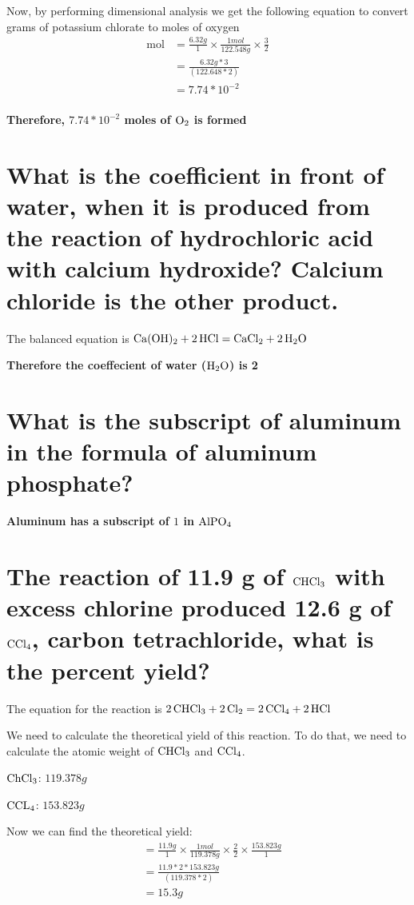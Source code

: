 \documentclass{scrartcl}
\begin{document}
Now, by performing dimensional analysis we get the following equation to convert
grams of potassium chlorate to moles of oxygen
\begin{align*}
  \text{mol}&=\frac{6.32g}{1}\times\frac{1mol}{122.548g}\times\frac{3}{2}\\
  &=\frac{6.32g*3}{(122.648*2)}\\
  &=7.74*10^{-2}\\
\end{align*}

\textbf{Therefore, \(7.74*10^{-2}\) moles of \(\ce{O2}\) is formed}

\section{What is the coefficient in front of water, when it is produced from the reaction of hydrochloric acid with calcium hydroxide? Calcium chloride is the other product.}
\label{sec:orgccc9176}
The balanced equation is
\(\ce{Ca(OH)2 + 2HCl}=\ce{CaCl2 + 2H2O}\)

\textbf{Therefore the coeffecient of water (\(\ce{H2O}\)) is 2}

\section{What is the subscript of aluminum in the formula of aluminum phosphate?}
\label{sec:org22d90a0}
\textbf{Aluminum has a subscript of \(1\) in \(\ce{AlPO4}\)}

\section{The reaction of 11.9 g of \(\ce{CHCl3}\) with excess chlorine produced 12.6 g of \(\ce{CCl4}\), carbon tetrachloride, what is the percent yield?}
\label{sec:orgc763c7a}
The equation for the reaction is
\(\ce{2CHCl3 + 2Cl2}=\ce{2CCl4 + 2HCl}\)

We need to calculate the theoretical yield of this reaction. To do that, we need
to calculate the atomic weight of \(\ce{CHCl3}\) and \(\ce{CCl4}\).

\(\ce{ChCl3}\): \(119.378g\)

\(\ce{CCL4}\): \(153.823g\)

Now we can find the theoretical yield:
\begin{align*}
  &=\frac{11.9g}{1}\times\frac{1mol}{119.378g}\times\frac{2}{2}\times\frac{153.823g}{1}\\
  &=\frac{11.9*2*153.823g}{(119.378*2)}\\
  &=15.3g\\
\end{align*}
\end{document}
